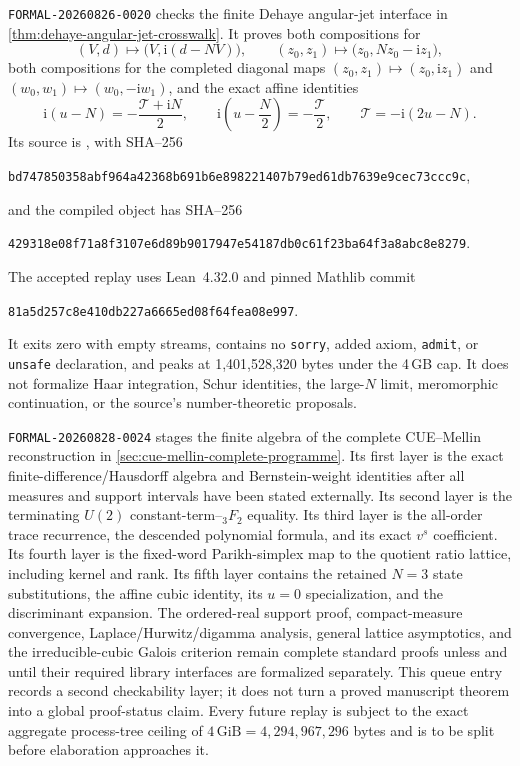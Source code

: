 \texttt{FORMAL-20260826-0020} checks the finite Dehaye angular-jet interface in
\cref{thm:dehaye-angular-jet-crosswalk}.  It proves both compositions for
\[
 (V,d)\longmapsto\bigl(V,\mathrm i(d-NV)\bigr),\qquad
 (z_0,z_1)\longmapsto\bigl(z_0,Nz_0-\mathrm iz_1\bigr),
\]
both compositions for the completed diagonal maps
$ (z_0,z_1)\mapsto(z_0,\mathrm iz_1)$ and
$(w_0,w_1)\mapsto(w_0,-\mathrm iw_1)$, and the exact affine identities
\[
 \mathrm i(u-N)=-\frac{\mathcal T+\mathrm iN}{2},\qquad
 \mathrm i\left(u-\frac N2\right)=-\frac{\mathcal T}{2},
 \qquad \mathcal T=-\mathrm i(2u-N).
\]
Its source is
, with
SHA--256
\begin{center}\small
\texttt{bd747850358abf964a42368b691b6e898221407b79ed61db7639e9cec73ccc9c},
\end{center}
and the compiled object has SHA--256
\begin{center}\small
\texttt{429318e08f71a8f3107e6d89b9017947e54187db0c61f23ba64f3a8abc8e8279}.
\end{center}
The accepted replay uses Lean~4.32.0 and pinned Mathlib commit
\begin{center}\small
\texttt{81a5d257c8e410db227a6665ed08f64fea08e997}.
\end{center}
It exits zero with empty streams,
contains no \texttt{sorry}, added axiom, \texttt{admit}, or \texttt{unsafe}
declaration, and peaks at 1,401,528,320 bytes under the 4\,GB cap.  It does not
formalize Haar integration, Schur identities, the large-$N$ limit,
meromorphic continuation, or the source's number-theoretic proposals.

\texttt{FORMAL-20260828-0024} stages the finite algebra of the complete CUE--Mellin
reconstruction in \cref{sec:cue-mellin-complete-programme}.  Its first layer is the exact
finite-difference/Hausdorff algebra and Bernstein-weight identities after all measures and
support intervals have been stated externally.  Its second layer is the terminating
$U(2)$ constant-term--${}_3F_2$ equality.  Its third layer is the all-order trace recurrence,
the descended polynomial formula, and its exact $v^s$ coefficient.  Its fourth layer is the
fixed-word Parikh-simplex map to the quotient ratio lattice, including kernel and rank.  Its
fifth layer contains the retained $N=3$ state substitutions, the affine cubic identity, its
$u=0$ specialization, and the discriminant expansion.  The ordered-real support proof,
compact-measure convergence, Laplace/Hurwitz/digamma analysis, general lattice asymptotics,
and the irreducible-cubic Galois criterion remain complete standard proofs unless and until
their required library interfaces are formalized separately.  This queue entry records a
second checkability layer; it does not turn a proved manuscript theorem into a global
proof-status claim.  Every future replay is subject to the exact aggregate
process-tree ceiling of $4\,\mathrm{GiB}=4{,}294{,}967{,}296$ bytes and is to
be split before elaboration approaches it.

